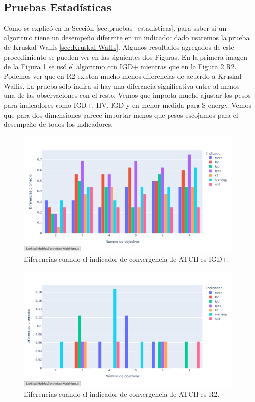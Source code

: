 \subsection{Pruebas Estadísticas}

Como se explicó en la Sección \ref{sec:pruebas_estadisticas}, para saber si un algoritmo tiene un desempeño diferente en un indicador dado usaremos la prueba de Kruskal-Wallis \ref{sec:Kruskal-Wallis}. Algunos resultados agregados de este procedimiento se pueden ver en las siguientes dos Figuras. En la primera imagen de la Figura \ref{fig:KW_dim_IGDp} se usó el algoritmo con IGD+ mientras que en la Figura \ref{fig:KW_dim_R2} R2. Podemos ver que en R2 existen mucho menos diferencias de acuerdo a Kruskal-Wallis.   La prueba sólo indica si hay una diferencia significativa entre al menos una de las observaciones con el resto. Vemos que importa mucho ajustar los pesos para indicadores como IGD+, HV, IGD y en menor medida para S-energy. Vemos que para dos dimensiones parece importar menos que pesos escojamos para el desempeño de todos los indicadores.

\begin{figure}[H]
    \centering
    \includegraphics[width=\textwidth]{Figuras/KW_obj_indconv_IGD+.pdf}
    \caption[Kruskal-Wallis IGD+]{Diferencias cuando el indicador de convergencia de ATCH es IGD+.}
    \label{fig:KW_dim_IGDp}
\end{figure}

\begin{figure}[H]
    \centering
    \includegraphics[width=\textwidth]{Figuras/KW_obj_indconv_R2.pdf}
    \caption[Kruskal-Wallis R2]{Diferencias cuando el indicador de convergencia de ATCH es R2.}
    \label{fig:KW_dim_R2}
\end{figure}


